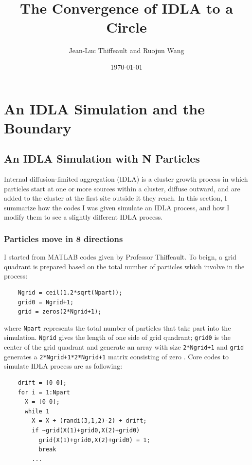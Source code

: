 \documentclass[letterpaper]{article}
\title{	
	\normalfont \normalsize 
	\huge The Convergence of IDLA to a Circle \\ %
}
\author{Jean-Luc Thiffeault and Ruojun Wang} %
\date{\normalsize\today} %
\numberwithin{equation}{section} %
\numberwithin{figure}{section} %
\numberwithin{table}{section} %
\begin{document}
	
\maketitle %
	

\section{An IDLA Simulation and the Boundary}

\subsection{An IDLA Simulation with N Particles}

Internal diffusion-limited aggregation (IDLA) is a cluster growth process in which particles start at one or more sources within a cluster, diffuse outward, and are added to the cluster at the first site outside it they reach. In this section, I summarize how the codes I was given simulate an IDLA process, and how I modify them to see a slightly different IDLA process.

\subsubsection{Particles move in 8 directions}
I started from  MATLAB codes given by Professor Thiffeault. To beign, a grid quadrant is prepared based on the total number of particles which involve in the process:

\begin{lstlisting}
    Ngrid = ceil(1.2*sqrt(Npart)); 
	grid0 = Ngrid+1;                
	grid = zeros(2*Ngrid+1);
\end{lstlisting}

\noindent
where \texttt{Npart} represents the total number of particles that take part into the simulation. \texttt{Ngrid} gives the length of one side of grid quadrant; \texttt{grid0} is the center of the grid quadrant and generate an array with size \texttt{2*Ngrid+1} and \texttt{grid} generates a \texttt{2*Ngrid+1*2*Ngrid+1} matrix consisting of zero . Core codes to simulate IDLA process are as following: 

\begin{lstlisting}
    drift = [0 0];
    for i = 1:Npart
	  X = [0 0];
      while 1
	    X = X + (randi(3,1,2)-2) + drift;	    
	    if ~grid(X(1)+grid0,X(2)+grid0)
	      grid(X(1)+grid0,X(2)+grid0) = 1;
	      break
        ...
\end{lstlisting}
\end{document}
